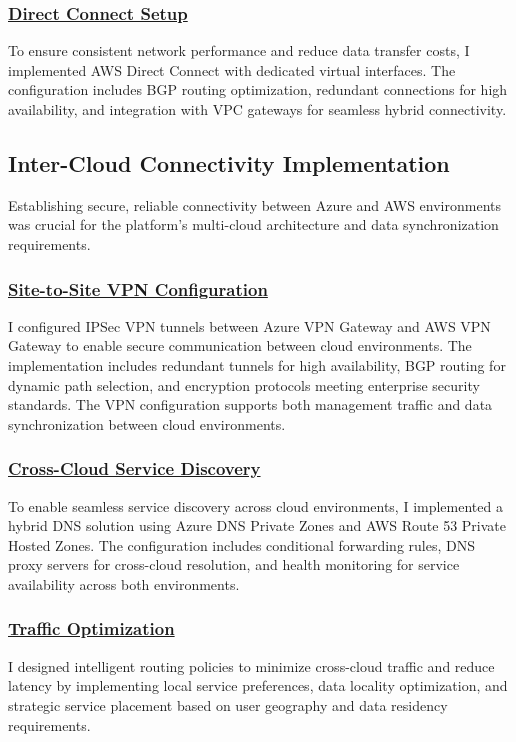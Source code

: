 \subsubsection*{\underline{Direct Connect Setup}}
To ensure consistent network performance and reduce data transfer costs, I implemented AWS Direct Connect with dedicated virtual interfaces. The configuration includes BGP routing optimization, redundant connections for high availability, and integration with VPC gateways for seamless hybrid connectivity.

\subsection{Inter-Cloud Connectivity Implementation}
Establishing secure, reliable connectivity between Azure and AWS environments was crucial for the platform's multi-cloud architecture and data synchronization requirements.

\subsubsection*{\underline{Site-to-Site VPN Configuration}}
I configured IPSec VPN tunnels between Azure VPN Gateway and AWS VPN Gateway to enable secure communication between cloud environments. The implementation includes redundant tunnels for high availability, BGP routing for dynamic path selection, and encryption protocols meeting enterprise security standards. The VPN configuration supports both management traffic and data synchronization between cloud environments.

\subsubsection*{\underline{Cross-Cloud Service Discovery}}
To enable seamless service discovery across cloud environments, I implemented a hybrid DNS solution using Azure DNS Private Zones and AWS Route 53 Private Hosted Zones. The configuration includes conditional forwarding rules, DNS proxy servers for cross-cloud resolution, and health monitoring for service availability across both environments.

\subsubsection*{\underline{Traffic Optimization}}
I designed intelligent routing policies to minimize cross-cloud traffic and reduce latency by implementing local service preferences, data locality optimization, and strategic service placement based on user geography and data residency requirements.

